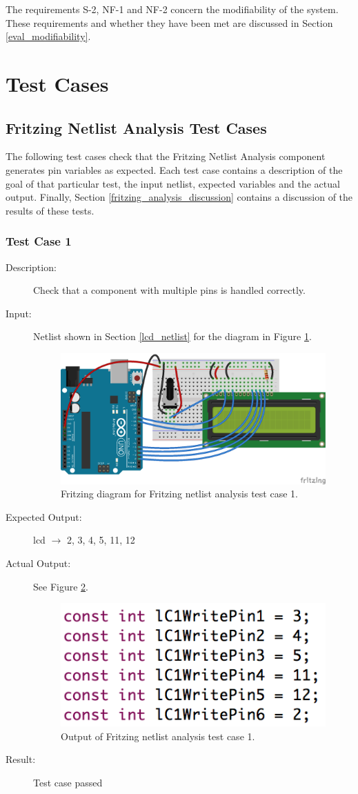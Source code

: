 \documentclass{UoYCSproject}
\begin{document}
The requirements S-2, NF-1 and NF-2 concern the modifiability of the system. These requirements and whether they have been met are discussed in Section \ref{eval_modifiability}.
	
\section{Test Cases} \label{test_cases}
	
\subsection{Fritzing Netlist Analysis Test Cases}
The following test cases check that the Fritzing Netlist Analysis component generates pin variables as expected. Each test case contains a description of the goal of that particular test, the input netlist, expected variables and the actual output. Finally, Section \ref{fritzing_analysis_discussion} contains a discussion of the results of these tests.

\subsubsection{Test Case 1}
\begin{description}
\item[Description:] Check that a component with multiple pins is handled correctly.
\item[Input:] Netlist shown in Section \ref{lcd_netlist} for the diagram in Figure \ref{fig:lcd_test}.
\begin{figure}[h!]
  \centering
  \includegraphics[width=0.5\linewidth]{graphics/LCD_test.png}
  \caption{Fritzing diagram for Fritzing netlist analysis test case 1.}
  \label{fig:lcd_test}
\end{figure}
\item[Expected Output:] lcd $\rightarrow$ 2, 3, 4, 5, 11, 12
\item[Actual Output:] See Figure \ref{fig:lcd_output}.
\begin{figure}[h!]
  \centering
  \includegraphics[width=0.4\linewidth]{graphics/lcd_test_output.png}
  \caption{Output of Fritzing netlist analysis test case 1.}
  \label{fig:lcd_output}
\end{figure}
\item[Result:] Test case passed
\end{description}
\end{document}
